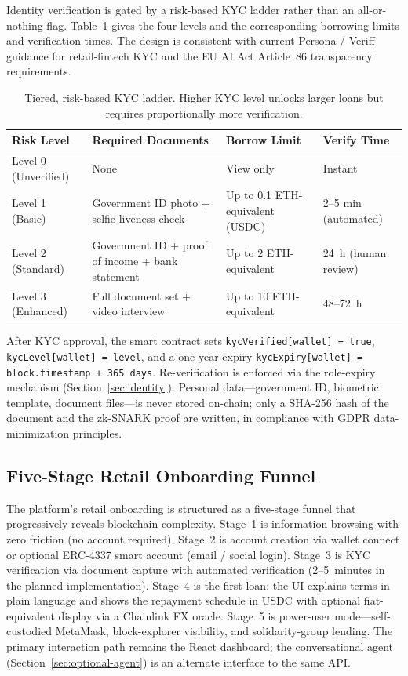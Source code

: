 \documentclass[12pt,a4paper]{report}
\newcommand{\tableheadcolor}{\rowcolor{TableHeadBg}}
\begin{document}
\label{sec:tiered-kyc}

Identity verification is gated by a risk-based KYC ladder rather than an all-or-nothing flag. Table~\ref{tab:tiered-kyc} gives the four levels and the corresponding borrowing limits and verification times. The design is consistent with current Persona / Veriff guidance for retail-fintech KYC and the EU AI Act Article~86 transparency requirements.

\begin{table}[H]
\centering
\caption[Tiered, risk-based KYC ladder]{Tiered, risk-based KYC ladder. Higher KYC level unlocks larger loans but requires proportionally more verification.}
\label{tab:tiered-kyc}
\begin{tabular}{p{2.2cm}p{5.8cm}p{2.8cm}p{2.6cm}}
\toprule
\tableheadcolor
\textbf{Risk Level} & \textbf{Required Documents} & \textbf{Borrow Limit} & \textbf{Verify Time} \\
\midrule
Level 0 (Unverified) & None & View only & Instant \\
Level 1 (Basic) & Government ID photo + selfie liveness check & Up to 0.1 ETH-equivalent (USDC) & 2--5 min (automated) \\
Level 2 (Standard) & Government ID + proof of income + bank statement & Up to 2 ETH-equivalent & 24~h (human review) \\
Level 3 (Enhanced) & Full document set + video interview & Up to 10 ETH-equivalent & 48--72~h \\
\bottomrule
\end{tabular}
\end{table}

After KYC approval, the smart contract sets \texttt{kycVerified[wallet] = true}, \texttt{kycLevel[wallet] = level}, and a one-year expiry \texttt{kycExpiry[wallet] = block.timestamp + 365 days}. Re-verification is enforced via the role-expiry mechanism (Section~\ref{sec:identity}). Personal data---government ID, biometric template, document files---is never stored on-chain; only a SHA-256 hash of the document and the zk-SNARK proof are written, in compliance with GDPR data-minimization principles.

\subsection{Five-Stage Retail Onboarding Funnel}
\label{sec:funnel}

The platform's retail onboarding is structured as a five-stage funnel that progressively reveals blockchain complexity. Stage~1 is information browsing with zero friction (no account required). Stage~2 is account creation via wallet connect or optional ERC-4337 smart account (email / social login). Stage~3 is KYC verification via document capture with automated verification (2--5~minutes in the planned implementation). Stage~4 is the first loan: the UI explains terms in plain language and shows the repayment schedule in USDC with optional fiat-equivalent display via a Chainlink FX oracle. Stage~5 is power-user mode---self-custodied MetaMask, block-explorer visibility, and solidarity-group lending. The primary interaction path remains the React dashboard; the conversational agent (Section~\ref{sec:optional-agent}) is an alternate interface to the same API.
\end{document}

